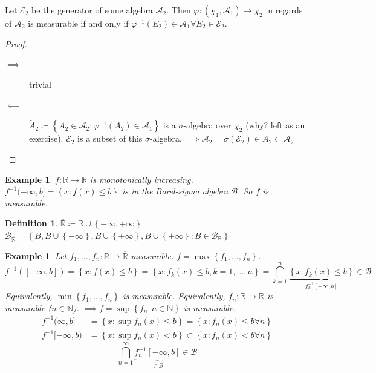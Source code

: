 \documentclass[a4paper]{article}
\newcounter{lecref}[section]
\numberwithin{lecref}{section}
\theoremstyle{break}
\newtheorem{example}[lecref]{Example}
\newtheorem*{Example}{Example}
\newtheorem*{Definition}{Definition}
\newcommand{\Set}[1]{\left\{#1\right\}}
\newcommand{\Max}[1]{\max{\Set{#1}}}
\newcommand{\Min}[1]{\min{\Set{#1}}}
\newcommand{\Sup}[1]{\sup{\Set{#1}}}
\begin{document}
\begin{theorem}
  Let $\mathcal E_2$ be the generator of some algebra $\mathcal A_2$.
  Then $\varphi: (\chi_1, \mathcal A_1) \to \chi_2$ in regards of $\mathcal A_2$ is measurable
  if and only if $\varphi^{-1}(E_2) \in \mathcal A_1 \forall E_2 \in \mathcal E_2$.
\end{theorem}
\begin{proof}
  \begin{description}
    \item[$\implies$] trivial
    \item[$\impliedby$]
      $\tilde A_2 \coloneqq \Set{A_2 \in \mathcal A_2: \varphi^{-1}(A_2) \in \mathcal A_1}$
      is a $\sigma$-algebra over $\chi_2$ (why? left as an exercise).
      $\mathcal E_2$ is a subset of this $\sigma$-algebra.
      $\implies \mathcal A_2 = \sigma(\mathcal E_2) \in \tilde A_2 \subset \mathcal A_2$
  \end{description}
\end{proof}

\begin{Example}
  $f: \mathbb R \to \mathbb R$ is monotonically increasing.
  $f^{-1}(-\infty, b] = \Set{x: f(x) \leq b}$ is in the Borel-sigma algebra $\mathcal B$.
  So $f$ is measurable.
\end{Example}

\begin{Definition}
  $\overline{\mathbb R} \coloneqq \mathbb R \cup \Set{-\infty, +\infty}$ \\
  ${\mathcal B}_{\overline{\mathbb R}} = \Set{B, B \cup \Set{-\infty}, B \cup \Set{+\infty}, B \cup \Set{\pm\infty}: B \in \mathcal B_{\mathbb R}}$
\end{Definition}

\begin{example}
  Let $f_1, \dots, f_n: \mathbb R \to \overline{\mathbb R}$ measurable.
  $f = \Max{f_1, \dots, f_n}$.
  \[ f^{-1}([-\infty, b]) = \Set{x: f(x) \leq b} = \Set{x: f_k(x) \leq b, k = 1, \dots, n} = \bigcap_{k=1}^n \underbrace{\Set{x: f_k(x) \leq b}}_{f_k^{-1}[-\infty, b]} \in \mathcal B \]
  Equivalently, $\Min{f_1, \dots, f_n}$ is measurable.
  Equivalently, $f_n: \mathbb R \to \overline{\mathbb R}$ is measurable ($n \in \mathbb N$).
  $\implies f = \Sup{f_n: n \in \mathbb N}$ is measurable.
  \begin{align*}
    f^{-1}(\infty, b] &= \Set{x: \sup f_n(x) \leq b} = \Set{x: f_n(x) \leq b \forall n} \\
    f^{-1}[-\infty, b) &= \Set{x: \sup{f_n(x)} < b} \subset \Set{x: f_n(x) < b \forall n}
  \end{align*}
  \[ \bigcap_{n=1}^\infty \underbrace{f_n^{-1}[-\infty, b]}_{\in \mathcal B} \in \mathcal B \]
\end{example}
\end{document}
